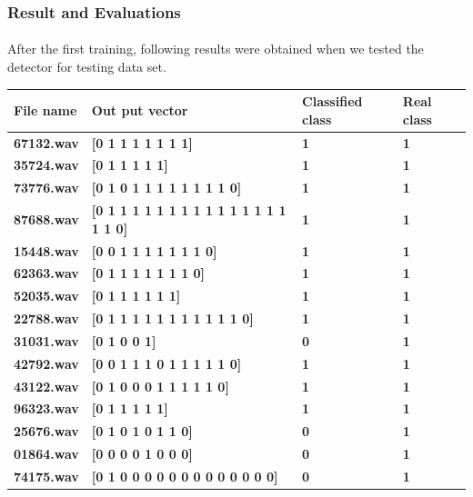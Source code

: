 \documentclass[12pt]{article}
\numberwithin{figure}{section}
\numberwithin{table}{section}
\begin{document}
\subsubsection{Result and Evaluations}
\paragraph{}
After the first training, following results were obtained when we tested the detector for testing data set. 

\newpage
\begin{table}[H]
\centering
\begin{tabular}{|m{}|m{}|m{}|m{}|} 
\hline
\bf {File name} &  \bf{Out put vector} & \bf{Classified class} & \bf{Real class}\\
\hline
\bf {67132.wav} &  {\bf{[0 1 1 1 1 1 1 1]}} &  {\bf{1}} &  {\bf{1}} \\ \hline
\bf {35724.wav} &  {\bf{[0 1 1 1 1 1]}} &  {\bf{1}} &  {\bf{1}} \\ \hline
\bf {73776.wav} &  {\bf{[0 1 0 1 1 1 1 1 1 1 1 0]}} &  {\bf{1}} &  {\bf{1}} \\ \hline
\bf {87688.wav} &  {\bf{[0 1 1 1 1 1 1 1 1 1 1 1 1 1 1 1 1 1 0]}} &  {\bf{1}} &  {\bf{1}} \\ \hline
\bf {15448.wav} &  {\bf{[0 0 1 1 1 1 1 1 1 0]}} &  {\bf{1}} &  {\bf{1}} \\ \hline
\bf {62363.wav} &  {\bf{[0 1 1 1 1 1 1 1 0]}} &  {\bf{1}} &  {\bf{1}} \\ \hline
\bf {52035.wav} &  {\bf{[0 1 1 1 1 1 1]}} &  {\bf{1}} &  {\bf{1}} \\ \hline
\bf {22788.wav} &  {\bf{[0 1 1 1 1 1 1 1 1 1 1 1 0]}} &  {\bf{1}} &  {\bf{1}} \\ \hline
\bf {31031.wav} &  {\bf{[0 1 0 0 1]}} &  {\bf{0}} &  {\bf{1}} \\ \hline
\bf {42792.wav} &  {\bf{[0 0 1 1 1 0 1 1 1 1 1 0]}} &  {\bf{1}} &  {\bf{1}} \\ \hline
\bf {43122.wav} &  {\bf{[0 1 0 0 0 1 1 1 1 1 0]}} &  {\bf{1}} &  {\bf{1}} \\ \hline
\bf {96323.wav} &  {\bf{[0 1 1 1 1 1]}} &  {\bf{1}} &  {\bf{1}} \\ \hline
\bf {25676.wav} &  {\bf{[0 1 0 1 0 1 1 0]}} &  {\bf{0}} &  {\bf{1}} \\ \hline
\bf {01864.wav} &  {\bf{[0 0 0 0 1 0 0 0]}} &  {\bf{0}} &  {\bf{1}} \\ \hline
\bf {74175.wav} &  {\bf{[0 1 0 0 0 0 0 0 0 0 0 0 0 0 0]}} &  {\bf{0}} &  {\bf{1}} \\ \hline

\end{tabular}
\end{table}
\end{document}

